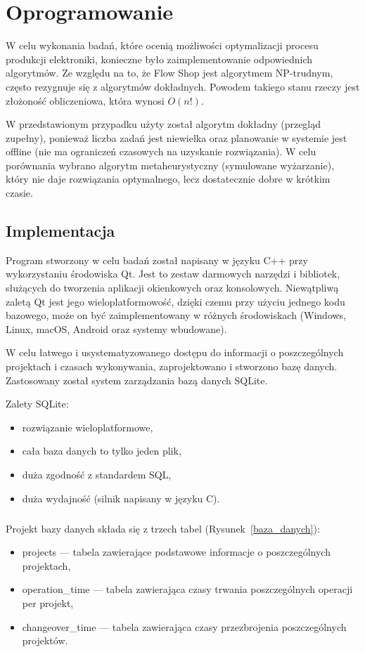 \chapter{Oprogramowanie}

W celu wykonania badań, które ocenią możliwości optymalizacji procesu produkcji elektroniki, konieczne było zaimplementowanie odpowiednich algorytmów.
Ze względu na to, że Flow Shop jest algorytmem NP-trudnym, często rezygnuje się z algorytmów dokładnych. Powodem takiego stanu rzeczy jest złożoność obliczeniowa, która wynosi $O(n!)$.

W przedstawionym przypadku użyty został algorytm dokładny (przegląd zupełny), ponieważ liczba zadań jest niewielka oraz planowanie w systemie jest offline (nie ma ograniczeń czasowych na uzyskanie rozwiązania).
W celu porównania wybrano algorytm metaheurystyczny (symulowane wyżarzanie), który nie daje rozwiązania optymalnego, lecz dostatecznie dobre w krótkim czasie.

\section{Implementacja}
Program stworzony w celu badań został napisany w języku C++ przy wykorzystaniu środowiska Qt. Jest to zestaw darmowych narzędzi i bibliotek, służących do tworzenia aplikacji okienkowych oraz konsolowych. Niewątpliwą zaletą Qt jest jego wieloplatformowość, dzięki czemu przy użyciu jednego kodu bazowego, może on być zaimplementowany w różnych środowiskach (Windows, Linux, macOS, Android oraz systemy wbudowane).

\breakparagraph{}
W celu łatwego i usystematyzowanego dostępu do informacji o poszczególnych projektach i czasach wykonywania, zaprojektowano i stworzono bazę danych. Zastosowany został system zarządzania bazą danych SQLite.

\breakparagraph{}
Zalety SQLite:
\begin{itemize}
	\item rozwiązanie wieloplatformowe,
	\item cała baza danych to tylko jeden plik,
	\item duża zgodność z standardem SQL,
	\item duża wydajność (silnik napisany w języku C).
\end{itemize}

\newpage{}
\paragraph{}
Projekt bazy danych składa się z trzech tabel (Rysunek~\ref{baza_danych}):
\begin{itemize}
	\item projects --- tabela zawierające podstawowe informacje o poszczególnych projektach,
	\item operation\_time --- tabela zawierająca czasy trwania poszczególnych operacji per projekt,
	\item changeover\_time --- tabela zawierająca czasy przezbrojenia poszczególnych projektów.
\end{itemize}

